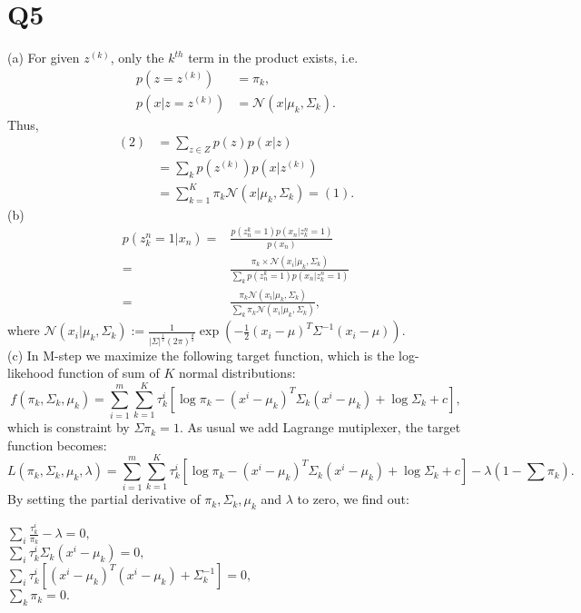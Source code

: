 \documentclass{article}
\begin{document}
\section{Q5}
(a) For given $z^{(k)}$, only the $k^{th}$ term in the product exists, i.e.
\begin{align*}
p(z=z^{(k)})&=\pi_k,\\
p(x|z=z^{(k)})&=\mathcal{N}(x|\mu_k, \Sigma_k).
\end{align*}
Thus, 
\begin{align*}
(2)&=\sum_{z\in Z}p(z)p(x|z)\\
&=\sum_kp(z^{(k)})p(x|z^{(k)})\\
&=\sum_{k=1}^{K}\pi_k\mathcal{N}(x|\mu_k, \Sigma_k)=(1).
\end{align*}
(b)
\begin{align*}
p(z_k^n=1|x_n)=&\frac{p(z^k_n=1)p(x_n|z_k^n=1)}{p(x_n)}\\
=&\frac{\pi_k\times\mathcal{N}(x_i|\mu_k, \Sigma_k)}{\sum_kp(z^k_n=1)p(x_n|z_k^n=1)}\\
=&\frac{\pi_k\mathcal{N}(x_i|\mu_k, \Sigma_k)}{\sum_k\pi_k\mathcal{N}(x_i|\mu_k, \Sigma_k)},
\end{align*}
where $\mathcal{N}\left(x_i | \mu_{k}, \Sigma_{k}\right) :=\frac{1}{|\Sigma|^{\frac{1}{2}}(2 \pi)^{\frac{d}{2}}} \exp \left(-\frac{1}{2}(x_i-\mu)^T \Sigma^{-1}(x_i-\mu)\right)$.\\
(c) In M-step we maximize the following target function, which is the log-likehood function of sum of $K$ normal distributions:
$$f(\pi_k, \Sigma_k, \mu_k)=\sum_{i=1}^{m} \sum_{k=1}^{K} \tau_{k}^{i}\left[\log \pi_{k}-\left(x^{i}-\mu_{k}\right)^{T} \Sigma_{k}\left(x^{i}-\mu_{k}\right)+\log \Sigma_{k}+c\right],$$
which is constraint by $\Sigma\pi_k=1$. As usual we add Lagrange mutiplexer, the target function becomes:
$$L(\pi_k, \Sigma_k, \mu_k, \lambda)=\sum_{i=1}^{m} \sum_{k=1}^{K} \tau_{k}^{i}\left[\log \pi_{k}-\left(x^{i}-\mu_{k}\right)^{T} \Sigma_{k}\left(x^{i}-\mu_{k}\right)+\log \Sigma_{k}+c\right]-\lambda(1-\sum\pi_k).$$
By setting the partial derivative of $\pi_k, \Sigma_k, \mu_k$ and $\lambda$ to zero, we find out:
\begin{center} 
$\sum_i\frac{\tau_k^i}{\pi_k}-\lambda=0,$\\
$\sum_i\tau_k^i\Sigma_k(x^i-\mu_k)=0,$\\
$\sum_i\tau_k^i[(x^i-\mu_k)^T(x^i-\mu_k)+\Sigma_k^{-1}]=0,$\\
$\sum_k\pi_k=0.$\\
\end{center}
\end{document}
